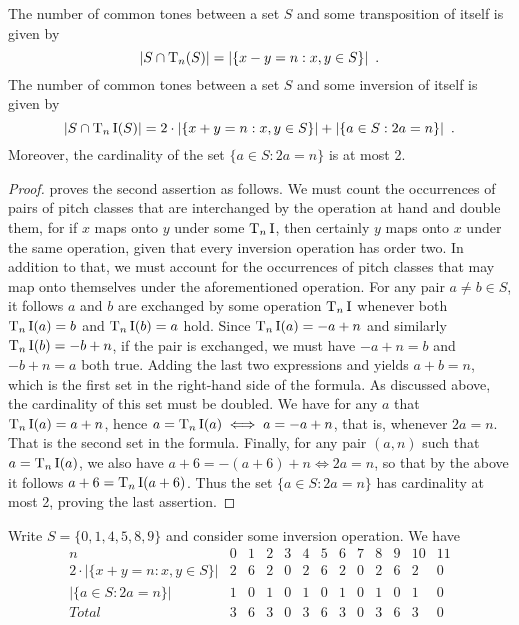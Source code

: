 \begin{theorem} The number of common tones between a set $S$ and some transposition of itself is given by
$$
|S \cap \operatorname{T}_n(S)| = |\{x - y = n : x, y \in S\}| \enspace.
$$
The number of common tones between a set $S$ and some inversion of itself is given by
$$
|S \cap \operatorname{T}_n\operatorname{I}(S)| = 2 \cdot |\{x + y = n : x, y \in S\}| + |\{a \in S : 2a = n\}| \enspace.
$$
Moreover, the cardinality of the set $\{a \in S : 2a = n\}$ is at most 2.

\begin{proof} \cite[??]{Rahn1975} proves the second assertion as follows. We must count the occurrences of pairs of pitch classes that are interchanged by the operation at hand and double them, for if $x$ maps onto $y$ under some $\operatorname{T}_n\operatorname{I}$, then certainly $y$ maps onto $x$ under the same operation, given that every inversion operation has order two. In addition to that, we must account for the occurrences of pitch classes that may map onto themselves under the aforementioned operation. For any pair $a \ne b \in S$, it follows $a$ and $b$ are exchanged by some operation $\operatorname{T}_n\operatorname{I}$ whenever both $\operatorname{T}_n\operatorname{I}(a) = b$ and $\operatorname{T}_n\operatorname{I}(b) = a$ hold. Since $\operatorname{T}_n\operatorname{I}(a) = -a + n$ and similarly $\operatorname{T}_n\operatorname{I}(b) = -b + n$, if the pair is exchanged, we must have $-a + n = b$ and $-b + n = a$ both true. Adding the last two expressions and yields $a + b = n$, which is the first set in the right-hand side of the formula. As discussed above, the cardinality of this set must be doubled. We have for any $a$ that $\operatorname{T}_n\operatorname{I}(a) = a + n$, hence $a = \operatorname{T}_n\operatorname{I}(a) \iff a = -a + n$, that is, whenever $2a = n$. That is the second set in the formula. Finally, for any pair $(a, n)$ such that $a = \operatorname{T}_n\operatorname{I}(a)$, we also have $a + 6 = -(a + 6) + n \iff 2a = n$, so that by the above it follows $a + 6 = \operatorname{T}_n\operatorname{I}(a + 6)$. Thus the set $\{a \in S : 2a = n\}$ has cardinality at most 2, proving the last assertion.
\end{proof}
\end{theorem}

\begin{example} \cite[??]{Rahn1975} Write $S = \{ 0, 1, 4, 5, 8, 9 \}$ and consider some inversion operation. We have
$$
\begin{array}{ *{13}{c} }
n & 0 & 1 & 2 & 3 & 4 & 5 & 6 & 7 & 8 & 9 & 10 & 11 \\
2 \cdot |\{x + y = n : x, y \in S\}| & 2 & 6 & 2 & 0 & 2 & 6 & 2 & 0 & 2 & 6 & 2 & 0 \\
|\{a \in S : 2a = n\}| & 1 & 0 & 1 & 0 & 1 & 0 & 1 & 0 & 1 & 0 & 1 & 0 \\
Total & 3 & 6 & 3 & 0 & 3 & 6 & 3 & 0 & 3 & 6 & 3 & 0
\end{array}
$$
\end{example}

